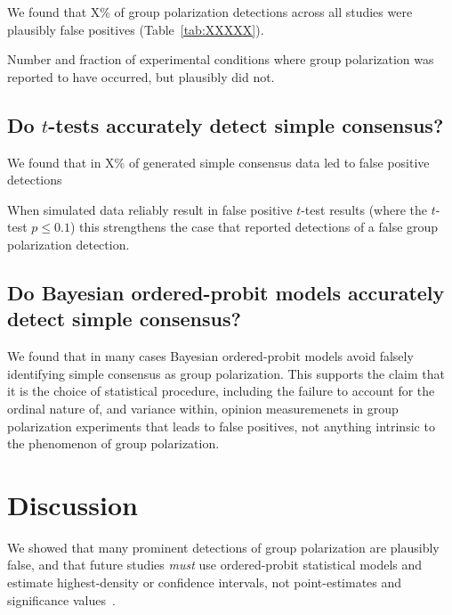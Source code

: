 \documentclass[11pt, letterpaper]{article}
\begin{document}
We found that X\% of group polarization detections across all studies were 
plausibly false positives (Table~\ref{tab:XXXXX}).

\vspace{.5em}
% 
  \begin{table}
    \begin{center}
      \caption{Number and fraction of experimental conditions where group polarization was
               reported to have occurred, but plausibly did not.}
      \vspace{.5em}
      
    \end{center}
  \end{table}

\subsection{Do $t$-tests accurately detect simple consensus?}

We found that in X\% of generated simple consensus data led to false positive
detections 

When simulated data reliably result in false positive $t$-test results (where
the $t$-test $p \le 0.1$) this strengthens the case that reported detections
of a false group polarization detection.


% 


\subsection{Do Bayesian ordered-probit models accurately detect simple consensus?}

We found that in many cases Bayesian ordered-probit models avoid falsely identifying simple
consensus as group polarization. This supports the claim that it is the choice of statistical
procedure, including the failure to account for the ordinal nature of, and variance within,
opinion measuremenets in group polarization experiments that leads to false
positives, not anything intrinsic to the phenomenon of group polarization.


\section{Discussion}

We showed that many prominent detections of group polarization are plausibly
false, and that future studies \emph{must} use ordered-probit statistical
models and estimate highest-density or confidence intervals, not point-estimates 
and significance values~\cite{Meehl1997}.
\end{document}
